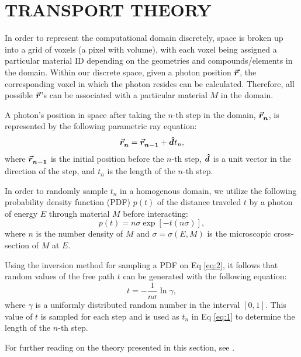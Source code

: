 \section{TRANSPORT THEORY}
\par In order to represent the computational domain discretely, space is broken up into a grid of voxels (a pixel with volume), with each voxel being assigned a particular material ID depending on the geometries and compounds/elements in the domain. Within our discrete space, given a photon position $\bm{\vec{r}_{}^{}}$, the corresponding voxel in which the photon resides can be calculated. Therefore, all possible $\bm{\vec{r}_{}^{}}$'s can be associated with a particular material $M$ in the domain.

\par A photon's position in space after taking the $n$-th step in the domain, $\bm{\vec{r}_{n}^{}}$, is represented by the following parametric ray equation:
\begin{equation} \label{eq:1}
    \bm{\vec{r}_{n}^{}} = \bm{\vec{r}_{n-1}^{}} + \bm{\hat{d}_{}^{}} t_n,
\end{equation}
where $\bm{\vec{r}_{n-1}^{}}$ is the initial position before the $n$-th step, $\bm{\hat{d}_{}^{}}$ is a unit vector in the direction of the step, and $t_n$ is the length of the $n$-th step.

\par In order to randomly sample $t_n$ in a homogenous domain, we utilize the following probability density function (PDF) $p(t)$ of the distance traveled $t$ by a photon of energy $E$ through material $M$ before interacting:
\begin{equation} \label{eq:2}
    p(t) = n\sigma \exp{\left[-t(n\sigma)\right]},
\end{equation}
where $n$ is the number density of $M$ and $\sigma = \sigma(E, M)$ is the microscopic cross-section of $M$ at $E$.
\par Using the inversion method for sampling a PDF on Eq \ref{eq:2}, it follows that random values of the free path $t$ can be generated with the following equation:
\begin{equation} \label{eq:3}
    t = -\frac{1}{n\sigma} \ln \gamma,
\end{equation}
where $\gamma$ is a uniformly distributed random number in the interval $[0, 1]$. This value of $t$ is sampled for each step and is used as $t_n$ in Eq \ref{eq:1} to determine the length of the $n$-th step.
\par For further reading on the theory presented in this section, see \cite{vassiliev_monte_2017}.

